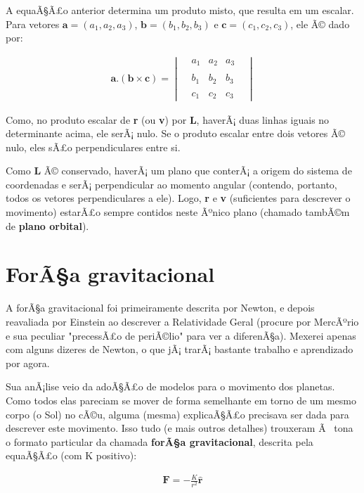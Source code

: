 A equaÃ§Ã£o anterior determina um produto misto, que resulta em um escalar. Para vetores $\mathbf{a} = (a_1, a_2, a_3)$, $\mathbf{b} = (b_1, b_2, b_3)$ e $\mathbf{c} = (c_1, c_2, c_3)$, ele Ã© dado por:

\begin{eqnarray}
	\mathbf{a . (b \times c)} = \begin{vmatrix} & a_1 & a_2 & a_3 &\\ \\&  b_1 & b_2 & b_3 &\\ \\ & c_1 & c_2 & c_3 &\end{vmatrix} \label{extra03}
\end{eqnarray} 

Como, no produto escalar de \textbf{r} (ou \textbf{v}) por \textbf{L}, haverÃ¡ duas linhas iguais no determinante acima, ele serÃ¡ nulo. Se o produto escalar entre dois vetores Ã© nulo, eles sÃ£o perpendiculares entre si.{\\}

Como \textbf{L} Ã© conservado, haverÃ¡  um plano que conterÃ¡ a origem do sistema de coordenadas e serÃ¡ perpendicular ao momento angular (contendo, portanto, todos os vetores perpendiculares a ele). Logo, \textbf{r} e \textbf{v} (suficientes para descrever o movimento) estarÃ£o sempre contidos neste Ãºnico plano (chamado tambÃ©m de \textbf{plano orbital}). 

\section{ForÃ§a gravitacional}

A forÃ§a gravitacional foi primeiramente descrita por Newton, e depois reavaliada por Einstein ao descrever a Relatividade Geral (procure por MercÃºrio e sua peculiar "precessÃ£o de periÃ©lio" para ver a diferenÃ§a). Mexerei apenas com alguns dizeres de Newton, o que jÃ¡ trarÃ¡ bastante trabalho e aprendizado por agora. {\\}

Sua anÃ¡lise veio da adoÃ§Ã£o de modelos para o movimento dos planetas. Como todos elas pareciam se mover de forma semelhante em torno de um mesmo corpo (o Sol) no cÃ©u, alguma (mesma) explicaÃ§Ã£o precisava ser dada para descrever este movimento. Isso tudo (e mais outros detalhes) trouxeram Ã  tona o formato particular da chamada \textbf{forÃ§a gravitacional}, descrita pela equaÃ§Ã£o (com K positivo):

\begin{eqnarray}
    \mathbf{F} = -\frac{K}{r^2}\mathbf{\hat{r}}    \label{eq21}
\end{eqnarray}

